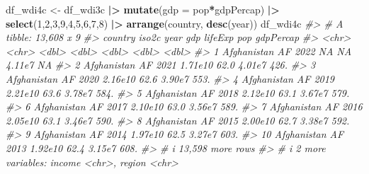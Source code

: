 \documentclass[
  xelatex, ja=standard]{bxjsbook}
\newenvironment{Shaded}{\begin{snugshade}}{\end{snugshade}}
\newcommand{\AttributeTok}[1]{\textcolor[rgb]{0.13,0.29,0.53}{#1}}
\newcommand{\CommentTok}[1]{\textcolor[rgb]{0.56,0.35,0.01}{\textit{#1}}}
\newcommand{\DecValTok}[1]{\textcolor[rgb]{0.00,0.00,0.81}{#1}}
\newcommand{\FunctionTok}[1]{\textcolor[rgb]{0.13,0.29,0.53}{\textbf{#1}}}
\newcommand{\NormalTok}[1]{#1}
\newcommand{\OtherTok}[1]{\textcolor[rgb]{0.56,0.35,0.01}{#1}}
\newcommand{\SpecialCharTok}[1]{\textcolor[rgb]{0.81,0.36,0.00}{\textbf{#1}}}
\theoremstyle{definition}
\theoremstyle{definition}
\theoremstyle{definition}
\theoremstyle{definition}
\theoremstyle{remark}
\begin{document}
\begin{Shaded}
\begin{Highlighting}[]
\NormalTok{df\_wdi4c }\OtherTok{\textless{}{-}}\NormalTok{ df\_wdi3c }\SpecialCharTok{|\textgreater{}} \FunctionTok{mutate}\NormalTok{(}\AttributeTok{gdp =}\NormalTok{ pop}\SpecialCharTok{*}\NormalTok{gdpPercap) }\SpecialCharTok{|\textgreater{}} 
  \FunctionTok{select}\NormalTok{(}\DecValTok{1}\NormalTok{,}\DecValTok{2}\NormalTok{,}\DecValTok{3}\NormalTok{,}\DecValTok{9}\NormalTok{,}\DecValTok{4}\NormalTok{,}\DecValTok{5}\NormalTok{,}\DecValTok{6}\NormalTok{,}\DecValTok{7}\NormalTok{,}\DecValTok{8}\NormalTok{) }\SpecialCharTok{|\textgreater{}} \FunctionTok{arrange}\NormalTok{(country, }\FunctionTok{desc}\NormalTok{(year))}
\NormalTok{df\_wdi4c}
\CommentTok{\#\textgreater{} \# A tibble: 13,608 x 9}
\CommentTok{\#\textgreater{}    country     iso2c  year      gdp lifeExp    pop gdpPercap}
\CommentTok{\#\textgreater{}    \textless{}chr\textgreater{}       \textless{}chr\textgreater{} \textless{}dbl\textgreater{}    \textless{}dbl\textgreater{}   \textless{}dbl\textgreater{}  \textless{}dbl\textgreater{}     \textless{}dbl\textgreater{}}
\CommentTok{\#\textgreater{}  1 Afghanistan AF     2022 NA          NA   4.11e7       NA }
\CommentTok{\#\textgreater{}  2 Afghanistan AF     2021  1.71e10    62.0 4.01e7      426.}
\CommentTok{\#\textgreater{}  3 Afghanistan AF     2020  2.16e10    62.6 3.90e7      553.}
\CommentTok{\#\textgreater{}  4 Afghanistan AF     2019  2.21e10    63.6 3.78e7      584.}
\CommentTok{\#\textgreater{}  5 Afghanistan AF     2018  2.12e10    63.1 3.67e7      579.}
\CommentTok{\#\textgreater{}  6 Afghanistan AF     2017  2.10e10    63.0 3.56e7      589.}
\CommentTok{\#\textgreater{}  7 Afghanistan AF     2016  2.05e10    63.1 3.46e7      590.}
\CommentTok{\#\textgreater{}  8 Afghanistan AF     2015  2.00e10    62.7 3.38e7      592.}
\CommentTok{\#\textgreater{}  9 Afghanistan AF     2014  1.97e10    62.5 3.27e7      603.}
\CommentTok{\#\textgreater{} 10 Afghanistan AF     2013  1.92e10    62.4 3.15e7      608.}
\CommentTok{\#\textgreater{} \# i 13,598 more rows}
\CommentTok{\#\textgreater{} \# i 2 more variables: income \textless{}chr\textgreater{}, region \textless{}chr\textgreater{}}
\end{Highlighting}
\end{Shaded}
\end{document}
